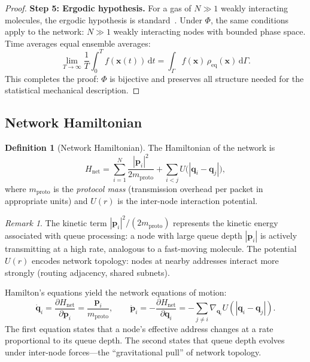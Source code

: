\documentclass[11pt,twocolumn,a4paper]{article}
\theoremstyle{definition}
\newtheorem{definition}[theorem]{Definition}
\theoremstyle{remark}
\newtheorem{remark}[theorem]{Remark}
\newcommand{\mpr}{m_{\mathrm{proto}}}
\newcommand{\Hnet}{H_{\mathrm{net}}}
\newcommand{\dd}{\mathrm{d}}
\newcommand{\pder}[2]{\frac{\partial #1}{\partial #2}}
\begin{document}
\begin{proof}
\medskip\noindent\textbf{Step 5: Ergodic hypothesis.}
For a gas of $N\gg 1$ weakly interacting molecules, the ergodic hypothesis is
standard~\cite{Pathria2011}.  Under $\Phi$, the same conditions apply to the
network: $N\gg 1$ weakly interacting nodes with bounded phase space.  Time
averages equal ensemble averages:
\begin{equation}\label{eq:ergodic}
  \lim_{T\to\infty}\frac{1}{T}\int_0^T f(\bm{x}(t))\,\dd t
  = \int_\Gamma f(\bm{x})\,\rho_{\mathrm{eq}}(\bm{x})\,\dd\Gamma.
\end{equation}
This completes the proof: $\Phi$ is bijective and preserves all structure
needed for the statistical mechanical description.
\end{proof}

\subsection{Network Hamiltonian}\label{sec:hamiltonian}

\begin{definition}[Network Hamiltonian]\label{def:hamiltonian}
The Hamiltonian of the network is
\begin{equation}\label{eq:hamiltonian}
  \Hnet = \sum_{i=1}^{N}\frac{|\bm{p}_i|^2}{2\mpr}
  + \sum_{i<j}U\bigl(|\bm{q}_i-\bm{q}_j|\bigr),
\end{equation}
where $\mpr$ is the \emph{protocol mass} (transmission overhead per packet
in appropriate units) and $U(r)$ is the inter-node interaction potential.
\end{definition}

\begin{remark}
The kinetic term $|\bm{p}_i|^2/(2\mpr)$ represents the kinetic energy
associated with queue processing: a node with large queue depth $|\bm{p}_i|$
is actively transmitting at a high rate, analogous to a fast-moving molecule.
The potential $U(r)$ encodes network topology: nodes at nearby addresses
interact more strongly (routing adjacency, shared subnets).
\end{remark}

Hamilton's equations yield the network equations of motion:
\begin{equation}\label{eq:hamilton_eqs}
  \dot{\bm{q}}_i = \pder{\Hnet}{\bm{p}_i} = \frac{\bm{p}_i}{\mpr},
  \qquad
  \dot{\bm{p}}_i = -\pder{\Hnet}{\bm{q}_i}
  = -\sum_{j\neq i}\nabla_{\bm{q}_i}U(|\bm{q}_i-\bm{q}_j|).
\end{equation}
The first equation states that a node's effective address changes at a rate
proportional to its queue depth.  The second states that queue depth evolves
under inter-node forces---the ``gravitational pull'' of network topology.
\end{document}
